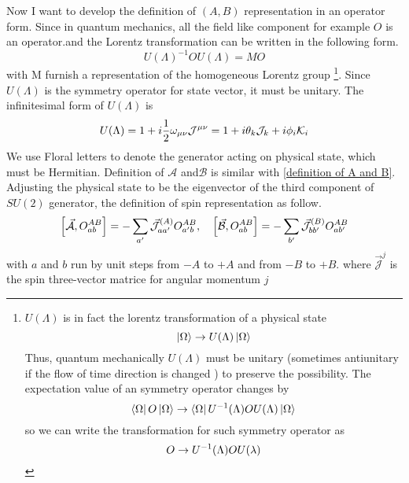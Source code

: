 Now I want to develop the definition of $(A,B)$ representation in an operator form. Since in quantum mechanics, all the field like component for example $O$ is an operator.and the Lorentz transformation can be written in the following form.
\begin{equation}\label{lorentz transformation of an operator}
U(\Lambda)^{-1} O U(\Lambda) = M O
\end{equation}
with M furnish a representation of the homogeneous Lorentz group
\footnote{
	$U(\Lambda)$ is in fact the lorentz transformation of a physical state
	\begin{equation}
		\ket{\Omega} \rightarrow U(\Lambda) \ket{\Omega} \notag
    \end{equation}
	Thus, quantum mechanically $U(\Lambda)$ must be unitary (sometimes antiunitary if the flow of time direction is changed ) to preserve the possibility. 
	The expectation value of an symmetry operator changes by
	\begin{equation} 
	\bra{\Omega}O\ket{\Omega}\rightarrow \bra{\Omega} U^{-1}(\Lambda)O U(\Lambda)\ket{\Omega} \notag
	\end{equation}
	so we can write the transformation for such symmetry operator as
	\begin{equation}
	O \rightarrow  U^{-1}(\Lambda)O U(\lambda)\notag
	\end{equation}
}.
Since $U(\Lambda)$ is the symmetry operator for state vector, it must be unitary. The infinitesimal form of $U(\Lambda)$ is
\begin{equation} \label{infinitesimal form of ULa}
U(\Lambda) = 1 +  i\frac{1}{2} \omega_{\mu\nu} \mathcal{J}^{\mu\nu}
=1 +  i \theta_k \mathcal{J}_k + i \phi_i \mathcal{K}_i
\end{equation}
We use Floral letters to denote the generator acting on physical state, which must be Hermitian. Definition of $\mathcal{A}$ and$\mathcal{B}$ is similar with \eqref{definition of A and B}. 
Adjusting the physical state to be the eigenvector of the third component of $SU(2)$ generator, the definition of spin representation as follow.
\begin{equation} \label{the definition of spin representation}
\comm{\vec{\mathcal{A}}}{O_{ab}^{AB}} = -\sum_{a'}\vec{\mathcal{J}}^{(A)}_{aa'}O^{AB}_{a'b},\quad
\comm{\vec{\mathcal{B}}}{O_{ab}^{AB}} = -\sum_{b'}\vec{\mathcal{J}}^{(B)}_{bb'}O^{AB}_{ab'}
\end{equation}
with $a$ and $b$ run by unit steps from $-A$ to $+A$ and from $-B$ to $+B$. where $\vec{\mathcal{J}}^{j}$ is the spin three-vector  matrice for angular momentum $j$
